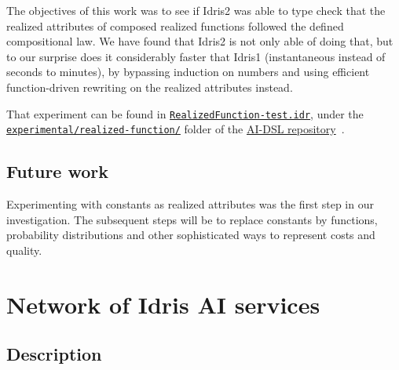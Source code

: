 \documentclass[]{report}
\begin{document}
The objectives of this work was to see if Idris2 was able to type
check that the realized attributes of composed realized functions
followed the defined compositional law.  We have found that Idris2 is
not only able of doing that, but to our surprise does it considerably
faster that Idris1 (instantaneous instead of seconds to minutes), by
bypassing induction on numbers and using efficient function-driven
rewriting on the realized attributes instead.

That experiment can be found in
\href{https://github.com/singnet/ai-dsl/blob/master/experimental/realized-function/RealizedFunction-test.idr}{\texttt{RealizedFunction-test.idr}},
under the
\href{https://github.com/singnet/ai-dsl/blob/master/experimental/realized-function/}{\texttt{experimental/realized-function/}}
folder of the \href{https://github.com/singnet/ai-dsl/}{AI-DSL
  repository}~\cite{AIDSLRepo}.

\subsection{Future work}

Experimenting with constants as realized attributes was the first step
in our investigation.  The subsequent steps will be to replace
constants by functions, probability distributions and other
sophisticated ways to represent costs and quality.

\section{Network of Idris AI services}
\label{sec:network_idris_ai_services}

\subsection{Description}
\end{document}
